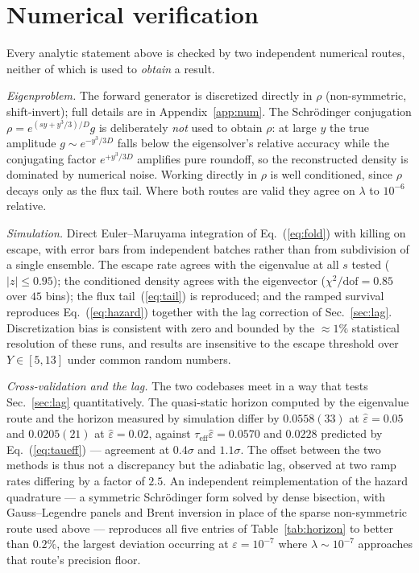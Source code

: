 \documentclass[%
 twocolumn,
 superscriptaddress,
 amsmath,amssymb,
 aps,
 pre,
 floatfix,
]{revtex4-2}
\newcommand{\Sig}{\hat\varepsilon}
\begin{document}
\section{\label{sec:num}Numerical verification}

Every analytic statement above is checked by two independent numerical routes, neither of which is used to \emph{obtain} a result.

\emph{Eigenproblem.}  The forward generator is discretized directly in $\rho$ (non-symmetric, shift-invert); full details are in Appendix~\ref{app:num}.  The Schr\"odinger conjugation $\rho=e^{(sy+y^3/3)/D}g$ is deliberately \emph{not} used to obtain $\rho$: at large $y$ the true amplitude $g\sim e^{-y^3/3D}$ falls below the eigensolver's relative accuracy while the conjugating factor $e^{+y^3/3D}$ amplifies pure roundoff, so the reconstructed density is dominated by numerical noise.  Working directly in $\rho$ is well conditioned, since $\rho$ decays only as the flux tail.  Where both routes are valid they agree on $\lambda$ to $10^{-6}$ relative.

\emph{Simulation.}  Direct Euler--Maruyama integration of Eq.~(\ref{eq:fold}) with killing on escape, with error bars from independent batches rather than from subdivision of a single ensemble.  The escape rate agrees with the eigenvalue at all $s$ tested ($|z|\le0.95$); the conditioned density agrees with the eigenvector ($\chi^2/\mathrm{dof}=0.85$ over $45$ bins); the flux tail~(\ref{eq:tail}) is reproduced; and the ramped survival reproduces Eq.~(\ref{eq:hazard}) together with the lag correction of Sec.~\ref{sec:lag}.  Discretization bias is consistent with zero and bounded by the ${\approx}1\%$ statistical resolution of these runs, and results are insensitive to the escape threshold over $Y\in[5,13]$ under common random numbers.

\emph{Cross-validation and the lag.}  The two codebases meet in a way that tests Sec.~\ref{sec:lag} quantitatively.  The quasi-static horizon computed by the eigenvalue route and the horizon measured by simulation differ by $0.0558(33)$ at $\Sig=0.05$ and $0.0205(21)$ at $\Sig=0.02$, against $\tau_{\mathrm{eff}}\Sig=0.0570$ and $0.0228$ predicted by Eq.~(\ref{eq:taueff}) --- agreement at $0.4\sigma$ and $1.1\sigma$.  The offset between the two methods is thus not a discrepancy but the adiabatic lag, observed at two ramp rates differing by a factor of $2.5$.  An independent reimplementation of the hazard quadrature --- a symmetric Schr\"odinger form solved by dense bisection, with Gauss--Legendre panels and Brent inversion in place of the sparse non-symmetric route used above --- reproduces all five entries of Table~\ref{tab:horizon} to better than $0.2\%$, the largest deviation occurring at $\varepsilon=10^{-7}$ where $\lambda\sim10^{-7}$ approaches that route's precision floor.
\end{document}
